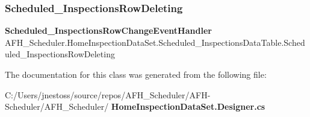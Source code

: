 \mbox{\label{class_a_f_h___scheduler_1_1_home_inspection_data_set_1_1_scheduled___inspections_data_table_a4c6e77b5d4758655bd7f18f9a706057a}} 
\subsubsection{Scheduled\_InspectionsRowDeleting}
{\footnotesize\ttfamily \textbf{ Scheduled\+\_\+\+Inspections\+Row\+Change\+Event\+Handler} A\+F\+H\+\_\+\+Scheduler.\+Home\+Inspection\+Data\+Set.\+Scheduled\+\_\+\+Inspections\+Data\+Table.\+Scheduled\+\_\+\+Inspections\+Row\+Deleting}



The documentation for this class was generated from the following file\+:\begin{DoxyCompactItemize}
\item 
C\+:/\+Users/jnestoss/source/repos/\+A\+F\+H\+\_\+\+Scheduler/\+A\+F\+H-\/\+Scheduler/\+A\+F\+H\+\_\+\+Scheduler/\textbf{ Home\+Inspection\+Data\+Set.\+Designer.\+cs}\end{DoxyCompactItemize}
